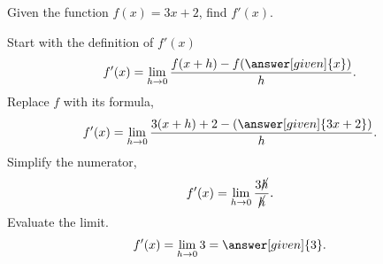 \documentclass{ximera}
\begin{document}
\begin{comment}
	\begin{question}
	  Let $f(x) = 3x+2$. What is $f'(-1)$?
	  \begin{multipleChoice}
	    \choice{$f'(-1) = 0$ because $f'(3)$ is a number, and a number corresponds to a horizontal line, which has a slope of zero.}
	    \choice[correct]{$f'(-1) = 3$ because $y=f(x)$ is a line with slope $3$.}
	    \choice{We cannot solve this problem yet.}
	  \end{multipleChoice}
	\end{question}
\end{comment}

\begin{example}
	Given the function $f(x) = 3x+2$, find  $f'(x)$. \\
	
	\begin{explanation}
		Start with the definition of $f'(x)$
		\[ f'(x) = \lim_{h\to0}\frac{f(x+h)-f(\answer[given]{x})}{h}. \]
		Replace $f$ with its formula,
		\[ f'(x) = \lim_{h\to0}\frac{3(x+h)+2-\left(\answer[given]{3x+2}\right)}{h}. \]
		Simplify the numerator,
		\[ f'(x) = \lim_{h\to0}\frac{3\cancel{h}}{\cancel{h}}. \]
		Evaluate the limit.		
		\[ f'(x) = \lim_{h\to0}{3}=\answer[given]{3}. \]		
	\end{explanation}
\end{example}
\end{document}
